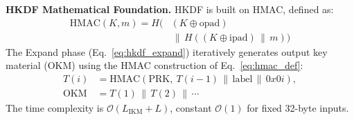\documentclass[journal, 10pt, twocolumn]{IEEEtran}
\begin{document}
\textbf{HKDF Mathematical Foundation.} HKDF is built on HMAC, defined as:
\begin{equation}
\begin{split}
\text{HMAC}(K, m) = H\big(&(K \oplus \text{opad}) \\
&\,\|\, H((K \oplus \text{ipad}) \,\|\, m)\big)
\end{split}
\label{eq:hmac_def}
\end{equation}
The Expand phase (Eq.~\eqref{eq:hkdf_expand}) iteratively generates output key material (OKM) using the HMAC construction of Eq.~\eqref{eq:hmac_def}:
\begin{equation}
\begin{split}
T(i) &= \text{HMAC}(\text{PRK},\ T(i\!-\!1) \,\|\, \text{label} \,\|\, 0x0i), \\
\text{OKM} &= T(1) \,\|\, T(2) \,\|\, \cdots
\end{split}
\label{eq:hkdf_expand}
\end{equation}
The time complexity is $\mathcal{O}(L_{\text{IKM}} + L)$, constant $\mathcal{O}(1)$ for fixed 32-byte inputs.
\end{document}
